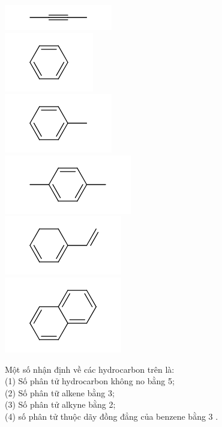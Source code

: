 \documentclass[10pt]{article}
\begin{document}
\includegraphics{smile-0e8d654a3e708708ef21429308cb866e00564526}\\
\includegraphics{smile-bca0308d7ac35b51496ad782213b5a2609a44648}\\
\includegraphics{smile-97b9ce6d965dabd632e639456cb629f0748f3017}\\
\includegraphics{smile-fbd09d2e2e2df96f7d77f19e65d31cfe800c64ba}\\
\includegraphics{smile-9efbb27159cf7c9bc191dd8248bcf704989a6fae}\\
\includegraphics{smile-a62a4bab4c17ae5d2e92863179a60f58c7dd4350}

Một số nhận định về các hydrocarbon trên là:\\
(1) Số phân tử hydrocarbon không no bằng 5;\\
(2) Số phân tữ alkene bằng 3;\\
(3) Số phân tử alkyne bằng 2;\\
(4) số phân tử thuộc dãy đồng đẳng của benzene bằng 3 .
\end{document}
